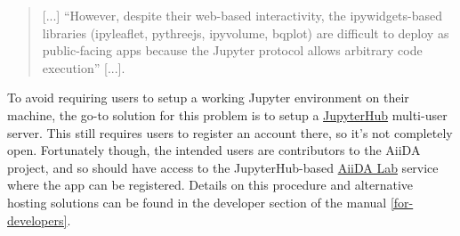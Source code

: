 \begin{quote}
    [...] ``However, despite their web-based interactivity, the ipywidgets-based
    libraries (ipyleaflet, pythreejs, ipyvolume, bqplot) are difficult to deploy
    as public-facing apps because the Jupyter protocol allows arbitrary code
    execution'' [...].
\end{quote}

To avoid requiring users to setup a working Jupyter environment on their
machine, the go-to solution for this problem is to setup a
\href{https://jupyter.org/hub}{JupyterHub} multi-user server. This still
requires users to register an account there, so it's not completely open.
Fortunately though, the intended users are contributors to the AiiDA project,
and so should have access to the JupyterHub-based \href{
  https://aiidalab.materialscloud.org/}{AiiDA Lab} service where the app can be
registered. Details on this procedure and alternative hosting solutions can be
found in the developer section of the manual \vref{for-developers}.



